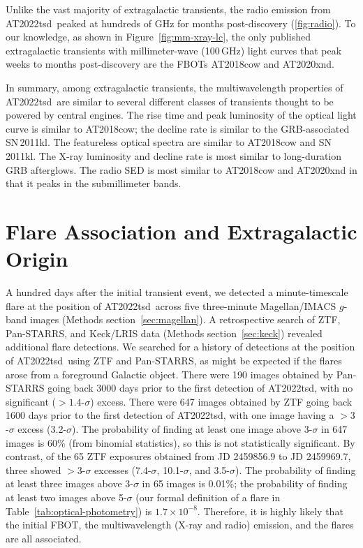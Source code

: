 \documentclass{nature_plusfigure}
\newcommand{\at}{AT2022tsd}
\begin{document}
\begin{methods}
Unlike the vast majority of extragalactic transients, the radio emission from \at\ peaked at hundreds of GHz for months post-discovery (\ref{fig:radio}). To our knowledge, as shown in Figure~\ref{fig:mm-xray-lc}, the only published extragalactic transients with millimeter-wave (100\,GHz) light curves that peak weeks to months post-discovery are the FBOTs AT2018cow\cite{Ho2019} and AT2020xnd\cite{Ho2022,Bright2022}. 

In summary, among extragalactic transients, the multiwavelength properties of \at\ are similar to several different classes of transients thought to be powered by central engines. The rise time and peak luminosity of the optical light curve is similar to AT2018cow; the decline rate is similar to the GRB-associated SN\,2011kl. The featureless optical spectra are similar to AT2018cow and SN\,2011kl. The X-ray luminosity and decline rate is most similar to long-duration GRB afterglows. The radio SED is most similar to AT2018cow and AT2020xnd in that it peaks in the submillimeter bands.

\section{Flare Association and Extragalactic Origin}
\label{sec:flare-association}

A hundred days after the initial transient event, we detected a minute-timescale flare at the position of \at\ across five three-minute Magellan/IMACS $g$-band images (Methods section~\ref{sec:magellan}). A retrospective search of ZTF, Pan-STARRS, and Keck/LRIS data (Methods section~\ref{sec:keck}) revealed additional flare detections. We searched for a history of detections at the position of \at\ using ZTF and Pan-STARRS, as might be expected if the flares arose from a foreground Galactic object. There were 190 images obtained by Pan-STARRS going back 3000 days prior to the first detection of \at, with no significant ($>1.4$-$\sigma$) excess\cite{Fulton2022}. There were 647 images obtained by ZTF going back 1600 days prior to the first detection of \at, with one image having a $>3$-$\sigma$ excess (3.2-$\sigma$). The probability of finding at least one image above 3-$\sigma$ in 647 images is 60\% (from binomial statistics), so this is not statistically significant. By contrast, of the 65 ZTF exposures obtained from JD 2459856.9 to JD 2459969.7, three showed $>3$-$\sigma$ excesses (7.4-$\sigma$, 10.1-$\sigma$, and 3.5-$\sigma$). The probability of finding at least three images above 3-$\sigma$ in 65 images is 0.01\%; the probability of finding at least two images above 5-$\sigma$ (our formal definition of a flare in Table~\ref{tab:optical-photometry}) is $1.7\times10^{-8}$. Therefore, it is highly likely that the initial FBOT, the multiwavelength (X-ray and radio) emission, and the flares are all associated. 


\end{methods}
\end{document}

